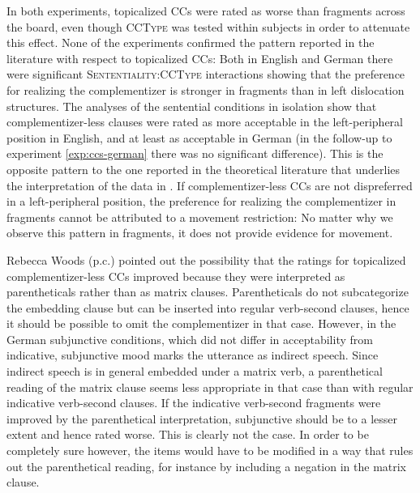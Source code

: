 In both experiments, topicalized CCs were rated as worse than fragments across the board, even though \textsc{CCType} was tested within subjects in order to attenuate this effect. None of the experiments confirmed the pattern reported in the literature with respect to topicalized CCs: Both in English and German there were significant \textsc{Sententiality:CCType} interactions showing that the preference for realizing the complementizer is stronger in fragments than in left dislocation structures. The analyses of the sentential conditions in isolation show that complementizer-less clauses were rated as more acceptable in the left-peripheral position in English, and at least as acceptable in German (in the follow-up to experiment \ref{exp:ccs-german} there was no significant difference). This is the opposite pattern to the one reported in the theoretical literature that underlies the interpretation of the data in \citet{merchant.etal2013}. If complementizer-less CCs are not dispreferred in a left-peripheral position, the preference for realizing the complementizer in fragments cannot be attributed to a movement restriction: No matter why we observe this pattern in fragments, it does not provide evidence for movement.

Rebecca Woods (p.c.) pointed out the possibility that the ratings for topicalized complementizer-less CCs improved because they were interpreted as parentheticals rather than as matrix clauses. Parentheticals do not subcategorize the embedding clause but can be inserted into regular verb-second clauses, hence it should be possible to omit the complementizer in that case. However, in the German subjunctive conditions, which did not differ in acceptability from indicative, subjunctive mood marks the utterance as indirect speech. Since indirect speech is in general embedded under a matrix verb, a parenthetical reading of the matrix clause seems less appropriate in that case than with regular indicative verb-second clauses. If the indicative verb-second fragments were improved by the parenthetical interpretation, subjunctive should be to a lesser extent and hence rated worse. This is clearly not the case. In order to be completely sure however, the items would have to be modified in a way that rules out the parenthetical reading, for instance by including a negation in the matrix clause.

